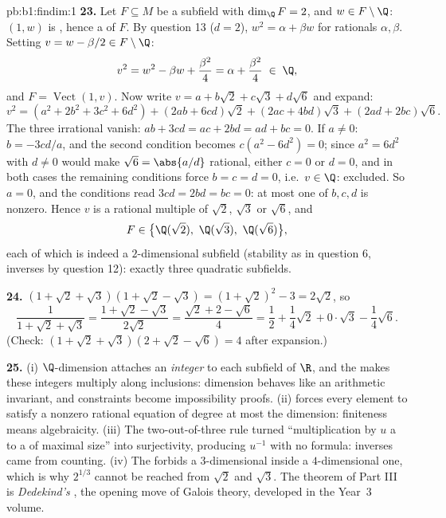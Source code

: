 \begin{solution}{pb:b1:findim:1}
\textbf{23.} Let $F \subseteq M$ be a subfield with $\dim_\Q F =
2$, and $w \in F \setminus \Q$: $(1, w)$ is , hence a 
of $F$. By question 13 ($d = 2$), $w^2 = \alpha + \beta w$ for
rationals $\alpha, \beta$. Setting $v = w - \beta/2 \in F
\setminus \Q$:
\[
v^2 = w^2 - \beta w + \frac{\beta^2}4 = \alpha + \frac{\beta^2}4
\;\in\; \Q,
\]
and $F = \operatorname{Vect}(1, v)$. Now write $v = a + b\sqrt2 +
c\sqrt3 + d\sqrt6$ and expand:
\[
v^2 = (a^2 + 2b^2 + 3c^2 + 6d^2)
+ (2ab + 6cd)\sqrt2 + (2ac + 4bd)\sqrt3 + (2ad + 2bc)\sqrt6 .
\]
The three irrational  vanish: $ab + 3cd = ac + 2bd =
ad + bc = 0$. If $a \neq 0$: $b = -3cd/a$, and the second
condition becomes $c(a^2 - 6d^2) = 0$; since $a^2 = 6d^2$ with $d
\neq 0$ would make $\sqrt6 = \abs{a/d}$ rational, either $c = 0$
or $d = 0$, and in both cases the remaining conditions force $b =
c = d = 0$, i.e.\ $v \in \Q$: excluded. So $a = 0$, and the
conditions read $3cd = 2bd = bc = 0$: at most one of $b, c, d$ is
nonzero. Hence $v$ is a rational multiple of $\sqrt2$, $\sqrt3$
or $\sqrt6$, and
\[
F \in \bigl\{\Q(\sqrt2),\ \Q(\sqrt3),\ \Q(\sqrt6)\bigr\} ,
\]
each of which is indeed a $2$-dimensional subfield (stability as
in question 6, inverses by question 12): exactly three quadratic
subfields.

\textbf{24.} $(1 + \sqrt2 + \sqrt3)(1 + \sqrt2 - \sqrt3) = (1 +
\sqrt2)^2 - 3 = 2\sqrt2$, so
\[
\frac1{1 + \sqrt2 + \sqrt3}
= \frac{1 + \sqrt2 - \sqrt3}{2\sqrt2}
= \frac{\sqrt2 + 2 - \sqrt6}{4}
= \frac12 + \frac14\sqrt2 + 0\cdot\sqrt3 - \frac14\sqrt6 .
\]
(Check: $(1 + \sqrt2 + \sqrt3)(2 + \sqrt2 - \sqrt6) = 4$ after
expansion.)

\textbf{25.} (i) $\Q$-dimension attaches an \emph{integer} to
each subfield of $\R$, and the  makes these integers
multiply along inclusions: dimension behaves like an arithmetic
invariant, and  constraints become impossibility
proofs. (ii)  forces every element to satisfy a
nonzero rational  equation of degree at most the
dimension: finiteness means algebraicity. (iii) The
two-out-of-three rule turned ``multiplication by $u$  a 
to a  of maximal size'' into surjectivity, producing
$u^{-1}$ with no formula: inverses came from counting. (iv) The
 forbids a $3$-dimensional  inside a
$4$-dimensional one, which is why $2^{1/3}$ cannot be reached
from $\sqrt2$ and $\sqrt3$. The theorem of Part III is
\emph{Dedekind's }, the opening move of Galois theory,
developed in the Year~3 volume.
\end{solution}
